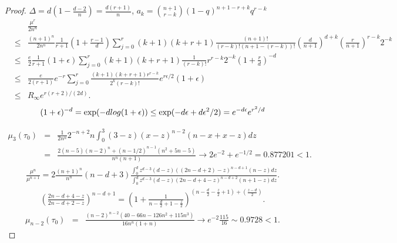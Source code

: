 \documentclass[10pt,a4paper]{amsart}
\def\log{{\rm log}}
\begin{document}
\begin{proof}
$\Delta=d(1-\frac{d-2}{n})=\frac{d(r+1)}{n}$, $a_k=\binom{n+1}{r-k}(1-q)^{n+1-r+k}q^{r-k}$
\begin{eqnarray*}
    &&\frac{\mu^r}{2n^n}\\
    &\le &\frac{(n+1)^n}{2n^n}\frac{1}{r+1}(1+\frac{r-1}{d})\sum_{j=0}^r (k+1)(k+r+1)\frac{(n+1)!}{(r-k)!(n+1-(r-k))!}(\frac{d}{n+1})^{d+k}(\frac{r}{n+1})^{r-k}2^{-k}\\
    &\le& \frac{e}{2}\frac{1}{r+1}(1+\epsilon)\sum_{j=0}^r(k+1)(k+r+1)\frac{1}{(r-k)!}r^{r-k}2^{-k}(1+\frac{r}{d})^{-d}\\
    &\le& \frac{e}{2(r+1)}e^{-r}\sum_{j=0}^r \frac{(k+1)(k+r+1)r^{r-k}}{2^k(r-k)!}e^{r\epsilon/2}(1+\epsilon)\\
    &\le& R_\infty e^{r(r+2)/(2d)}.
\end{eqnarray*}
\begin{eqnarray*}
    (1+\epsilon)^{-d}=\exp(-d \log(1+\epsilon))\le \exp(-d \epsilon+d\epsilon^2/2)=e^{-d\epsilon}e^{r^2/d}
\end{eqnarray*}

\begin{eqnarray*}
    \mu_3(\tau_0)&=&\frac{1}{2n^n}2^{-n+2}n\int_0^3(3-z)(x-z)^{n-2}(n-x+x-z)dz\\
    &=&\frac{2(n-5)(n-2)^n+(n-1/2)^{n-1}(n^2+5n-5)}{n^n(n+1)}\rightarrow 2 e^{-2}+e^{-1/2}=0.877201<1.
\end{eqnarray*}
\begin{eqnarray*}
    \frac{\mu^n}{\mu^{n+1}}=2\frac{(n+1)^n}{n^n}(n-d+3)
    \frac{\int_0^dz^{d-3}(d-z)((2n-d+2)-z)^{n-d+1}(n-z)dz}{\int_0^d z^{d-3}(d-z)(2n-d+4-z)^{n-d+2}(n+1-z)dz}.
\end{eqnarray*}
\begin{eqnarray*}
    \left(\frac{2n-d+4-z}{2n-d+2-z}\right)^{n-d+1}=\left(1+\frac{1}{n-\frac{d}{2}+1-\frac{z}{2}}\right)^{(n-\frac{d}{2}-\frac{z}{2}+1)+(\frac{z-d}{2})}. 
\end{eqnarray*}
\begin{eqnarray*}
    \mu_{n-2}(\tau_0)&=&\frac{(n-2)^{n-2}(40-66n-126 n^2+115 n^3)}{16n^n(1+n)}\rightarrow e^{-2}\frac{115}{16}\sim 0.9728<1. 
\end{eqnarray*}

\end{proof}
\end{document}
